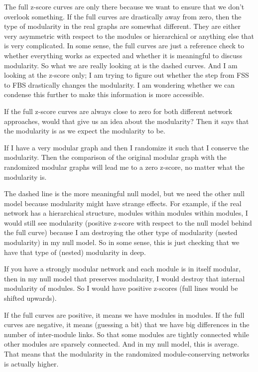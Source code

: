 

{\color{red}
	
	The full z-score curves are only there because we want to ensure that we don't overlook something. If the full curves are drastically away from zero, then the type of modularity in the real graphs are somewhat different. They are either very asymmetric with respect to the modules or hierarchical or anything else that is very complicated. In some sense, the full curves are just a reference check to whether everything works as expected and whether it is meaningful to discuss modularity. So what we are really looking at is the dashed curves. And I am looking at the z-score only; I am trying to figure out whether the step from FSS to FBS drastically changes the modularity. I am wondering whether we can condense this further to make this information is more accessible.
	
	If the full z-score curves are always close to zero for both different network approaches, would that give us an idea about the modularity? Then it says that the modularity is as we expect the modularity to be. 
	
	If I have a very modular graph and then I randomize it such that I conserve the modularity. Then the comparison of the original modular graph with the randomized modular graphs will lead me to a zero z-score, no matter what the modularity is. 
	
	The dashed line is the more meaningful null model, but we need the other null model because modularity might have strange effects. For example, if the real network has a hierarchical structure, modules within modules within modules, I would still see modularity (positive z-score with respect to the null model behind the full curve) because I am destroying the other type of modularity (nested modularity) in my null model. So in some sense, this is just checking that we have that type of (nested) modularity in deep.
	
	If you have a strongly modular network and each module is in itself modular, then in my null model that preserves modularity, I would destroy that internal modularity of modules. So I would have positive z-scores (full lines would be shifted upwards).
	
	If the full curves are positive, it means we have modules in modules. If the full curves are negative, it means (guessing a bit) that we have big differences in the number of inter-module links. So that some modules are tightly connected while other modules are sparsely connected. And in my null model, this is average. That means that the modularity in the randomized module-conserving networks is actually higher.
	
}
